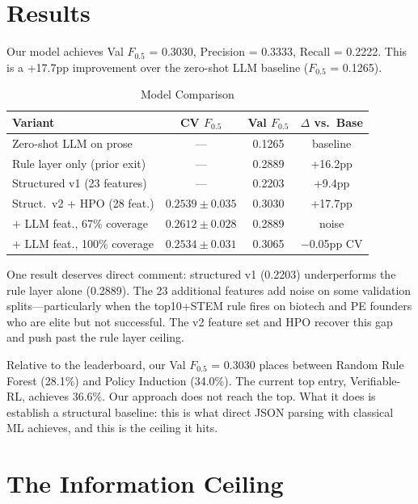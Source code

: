 \documentclass[10pt, conference]{IEEEtran}
\begin{document}
\section{Results}

Our model achieves Val $F_{0.5}$ = 0.3030, Precision = 0.3333, Recall = 0.2222. This is a +17.7pp improvement over the zero-shot LLM baseline ($F_{0.5}$ = 0.1265).

\begin{table}[h]
\centering
\caption{Model Comparison}
\begin{tabular}{@{}lccc@{}}
\toprule
\textbf{Variant} & \textbf{CV $F_{0.5}$} & \textbf{Val $F_{0.5}$} & \textbf{$\Delta$ vs.\ Base} \\
\midrule
Zero-shot LLM on prose          & ---                & 0.1265 & baseline     \\
Rule layer only (prior exit)    & ---                & 0.2889 & +16.2pp      \\
Structured v1 (23 features)     & ---                & 0.2203 & +9.4pp       \\
Struct.\ v2 + HPO (28 feat.)    & $0.2539 \pm 0.035$ & 0.3030 & +17.7pp      \\
+ LLM feat., 67\% coverage      & $0.2612 \pm 0.028$ & 0.2889 & noise        \\
+ LLM feat., 100\% coverage     & $0.2534 \pm 0.031$ & 0.3065 & $-$0.05pp CV \\
\bottomrule
\end{tabular}
\end{table}

One result deserves direct comment: structured v1 (0.2203) underperforms the rule layer alone (0.2889). The 23 additional features add noise on some validation splits---particularly when the top10+STEM rule fires on biotech and PE founders who are elite but not successful. The v2 feature set and HPO recover this gap and push past the rule layer ceiling.

Relative to the leaderboard, our Val $F_{0.5}$ = 0.3030 places between Random Rule Forest (28.1\%) and Policy Induction (34.0\%). The current top entry, Verifiable-RL, achieves 36.6\%. Our approach does not reach the top. What it does is establish a structural baseline: this is what direct JSON parsing with classical ML achieves, and this is the ceiling it hits.

\section{The Information Ceiling}
\end{document}
